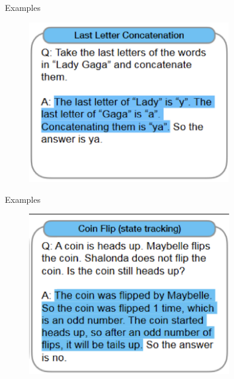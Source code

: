 \begin{vbframe}{Examples}

\vfill

\begin{figure}
    \centering
    \includegraphics[height=7cm]{figure/cotex5.png}
\end{figure}

\vfill

\end{vbframe}

\begin{vbframe}{Examples}

\vfill

\begin{figure}
    \centering
    \includegraphics[height=7cm]{figure/cotex6.png}
\end{figure}

\vfill

\end{vbframe}


